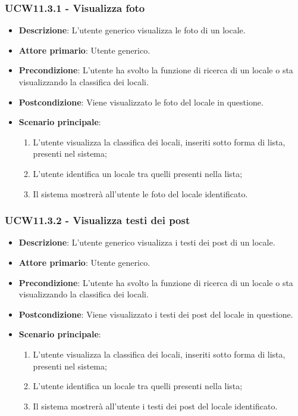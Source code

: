 \subsubsection{UCW11.3.1 - Visualizza foto}
\begin{itemize}
    \item \textbf{Descrizione}: L'utente generico visualizza le foto di un locale.
    \item \textbf{Attore primario}: Utente generico.
    \item \textbf{Precondizione}: L'utente ha svolto la funzione di ricerca di un locale o sta visualizzando la classifica dei locali.
    \item \textbf{Postcondizione}: Viene visualizzato le foto del locale in questione.
    \item \textbf{Scenario principale}: 
    \begin{enumerate}
        \item L'utente visualizza la classifica dei locali, inseriti sotto forma di lista, presenti nel sistema;
        \item L'utente identifica un locale tra quelli presenti nella lista;
        \item Il sistema mostrerà all'utente le foto del locale identificato.
        \end{enumerate}
\end{itemize}
\subsubsection{UCW11.3.2 - Visualizza testi dei post}
\begin{itemize}
    \item \textbf{Descrizione}: L'utente generico visualizza i testi dei post di un locale.
    \item \textbf{Attore primario}: Utente generico.
    \item \textbf{Precondizione}: L'utente ha svolto la funzione di ricerca di un locale o sta visualizzando la classifica dei locali.
    \item \textbf{Postcondizione}: Viene visualizzato i testi dei post del locale in questione.
    \item \textbf{Scenario principale}: 
    \begin{enumerate}
        \item L'utente visualizza la classifica dei locali, inseriti sotto forma di lista, presenti nel sistema;
        \item L'utente identifica un locale tra quelli presenti nella lista;
        \item Il sistema mostrerà all'utente i testi dei post del locale identificato.
        \end{enumerate}
\end{itemize}
